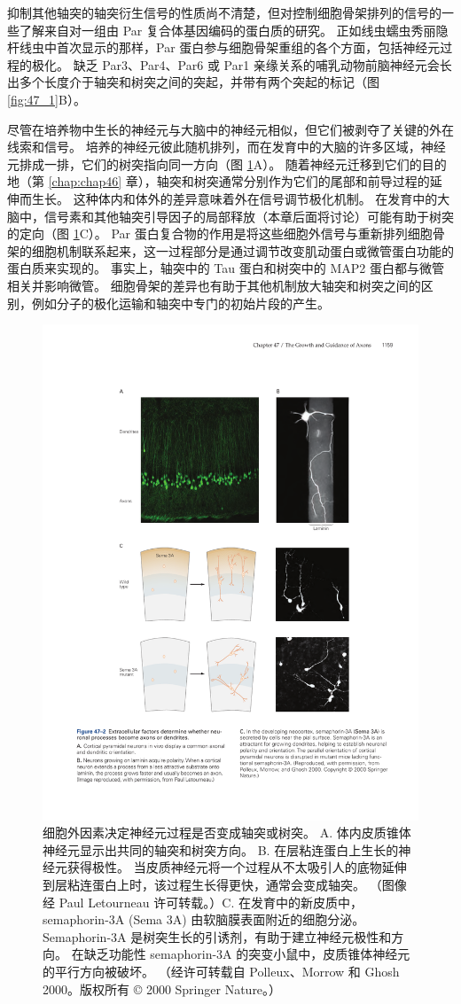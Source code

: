 抑制其他轴突的轴突衍生信号的性质尚不清楚，但对控制细胞骨架排列的信号的一些了解来自对一组由 Par 复合体基因编码的蛋白质的研究。 正如线虫蠕虫秀丽隐杆线虫中首次显示的那样，Par 蛋白参与细胞骨架重组的各个方面，包括神经元过程的极化。 缺乏 Par3、Par4、Par6 或 Par1 亲缘关系的哺乳动物前脑神经元会长出多个长度介于轴突和树突之间的突起，并带有两个突起的标记（图 \ref{fig:47_1}B）。

尽管在培养物中生长的神经元与大脑中的神经元相似，但它们被剥夺了关键的外在线索和信号。 
培养的神经元彼此随机排列，而在发育中的大脑的许多区域，神经元排成一排，它们的树突指向同一方向（图 \ref{fig:47_2}A）。 
随着神经元迁移到它们的目的地（第 \ref{chap:chap46} 章），轴突和树突通常分别作为它们的尾部和前导过程的延伸而生长。 这种体内和体外的差异意味着外在信号调节极化机制。 在发育中的大脑中，信号素和其他轴突引导因子的局部释放（本章后面将讨论）可能有助于树突的定向（图 \ref{fig:47_2}C）。 Par 蛋白复合物的作用是将这些细胞外信号与重新排列细胞骨架的细胞机制联系起来，这一过程部分是通过调节改变肌动蛋白或微管蛋白功能的蛋白质来实现的。 事实上，轴突中的 Tau 蛋白和树突中的 MAP2 蛋白都与微管相关并影响微管。 细胞骨架的差异也有助于其他机制放大轴突和树突之间的区别，例如分子的极化运输和轴突中专门的初始片段的产生。

\begin{figure}[htbp]
	\centering
	\includegraphics[width=0.65\linewidth]{chap47/fig_47_2}
	\caption{细胞外因素决定神经元过程是否变成轴突或树突。 A. 体内皮质锥体神经元显示出共同的轴突和树突方向。 B. 在层粘连蛋白上生长的神经元获得极性。 当皮质神经元将一个过程从不太吸引人的底物延伸到层粘连蛋白上时，该过程生长得更快，通常会变成轴突。 （图像经 Paul Letourneau 许可转载。）C. 在发育中的新皮质中，semaphorin-3A (Sema 3A) 由软脑膜表面附近的细胞分泌。 Semaphorin-3A 是树突生长的引诱剂，有助于建立神经元极性和方向。 在缺乏功能性 semaphorin-3A 的突变小鼠中，皮质锥体神经元的平行方向被破坏。 （经许可转载自 Polleux、Morrow 和 Ghosh 2000。版权所有 © 2000 Springer Nature。）}
	\label{fig:47_2}
\end{figure}

